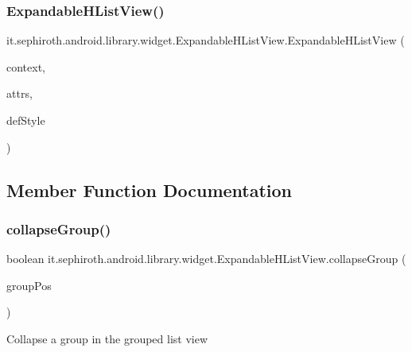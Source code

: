 \subsubsection{\texorpdfstring{Expandable\+H\+List\+View()}{ExpandableHListView()}\hspace{0.1cm}{\footnotesize\ttfamily [3/3]}}
{\footnotesize\ttfamily it.\+sephiroth.\+android.\+library.\+widget.\+Expandable\+H\+List\+View.\+Expandable\+H\+List\+View (\begin{DoxyParamCaption}\item[{Context}]{context,  }\item[{Attribute\+Set}]{attrs,  }\item[{int}]{def\+Style }\end{DoxyParamCaption})}



\subsection{Member Function Documentation}
\mbox{\label{classit_1_1sephiroth_1_1android_1_1library_1_1widget_1_1_expandable_h_list_view_ac5bebe66496bfbafeaa7901fe17f5dd4}} 
\subsubsection{\texorpdfstring{collapse\+Group()}{collapseGroup()}}
{\footnotesize\ttfamily boolean it.\+sephiroth.\+android.\+library.\+widget.\+Expandable\+H\+List\+View.\+collapse\+Group (\begin{DoxyParamCaption}\item[{int}]{group\+Pos }\end{DoxyParamCaption})}

Collapse a group in the grouped list view


